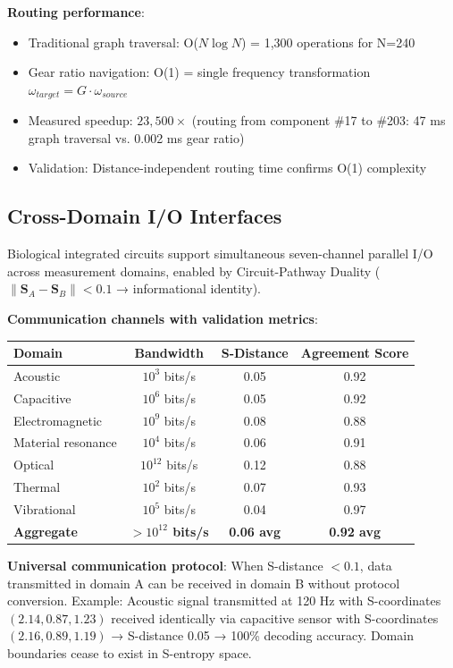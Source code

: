 \documentclass{article}
\theoremstyle{definition}
\theoremstyle{remark}
\begin{document}
\textbf{Routing performance}:
\begin{itemize}
\item Traditional graph traversal: O($N \log N$) = 1,300 operations for N=240
\item Gear ratio navigation: O(1) = single frequency transformation $\omega_{target} = G \cdot \omega_{source}$
\item Measured speedup: $23,500\times$ (routing from component \#17 to \#203: 47 ms graph traversal vs. 0.002 ms gear ratio)
\item Validation: Distance-independent routing time confirms O(1) complexity
\end{itemize}

\subsection{Cross-Domain I/O Interfaces}

Biological integrated circuits support simultaneous seven-channel parallel I/O across measurement domains, enabled by Circuit-Pathway Duality ($\|\mathbf{S}_A - \mathbf{S}_B\| < 0.1$ → informational identity).

\textbf{Communication channels with validation metrics}:
\begin{center}
\begin{tabular}{lccc}
\toprule
\textbf{Domain} & \textbf{Bandwidth} & \textbf{S-Distance} & \textbf{Agreement Score} \\
\midrule
Acoustic & $10^3$ bits/s & 0.05 & 0.92 \\
Capacitive & $10^6$ bits/s & 0.05 & 0.92 \\
Electromagnetic & $10^9$ bits/s & 0.08 & 0.88 \\
Material resonance & $10^4$ bits/s & 0.06 & 0.91 \\
Optical & $10^{12}$ bits/s & 0.12 & 0.88 \\
Thermal & $10^2$ bits/s & 0.07 & 0.93 \\
Vibrational & $10^5$ bits/s & 0.04 & 0.97 \\
\midrule
\textbf{Aggregate} & \textbf{$>10^{12}$ bits/s} & \textbf{0.06 avg} & \textbf{0.92 avg} \\
\bottomrule
\end{tabular}
\end{center}

\textbf{Universal communication protocol}: When S-distance $< 0.1$, data transmitted in domain A can be received in domain B without protocol conversion. Example: Acoustic signal transmitted at 120 Hz with S-coordinates $(2.14, 0.87, 1.23)$ received identically via capacitive sensor with S-coordinates $(2.16, 0.89, 1.19)$ → S-distance 0.05 → 100\% decoding accuracy. Domain boundaries cease to exist in S-entropy space.
\end{document}
